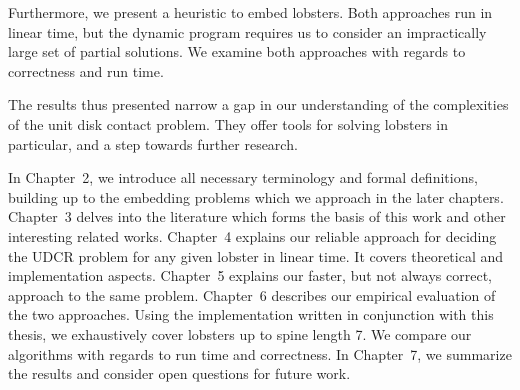 Furthermore, we present a heuristic to embed lobsters. Both approaches run in linear time, but the dynamic program requires us to consider an impractically large set of partial solutions. We examine both approaches with regards to correctness and run time.

The results thus presented narrow a gap in our understanding of the complexities of the unit disk contact problem. They offer tools for solving lobsters in particular, and a step towards further research.

In Chapter~2, we introduce all necessary terminology and formal definitions, building up to the embedding problems which we approach in the later chapters.
Chapter~3 delves into the literature which forms the basis of this work and other interesting related works.
Chapter~4 explains our reliable approach for deciding the UDCR problem for any given lobster in linear time. It covers theoretical and implementation aspects.
Chapter~5 explains our faster, but not always correct, approach to the same problem.
Chapter~6 describes our empirical evaluation of the two approaches. Using the implementation written in conjunction with this thesis, we exhaustively cover lobsters up to spine length 7. We compare our algorithms with regards to run time and correctness.
In Chapter~7, we summarize the results and consider open questions for future work.
